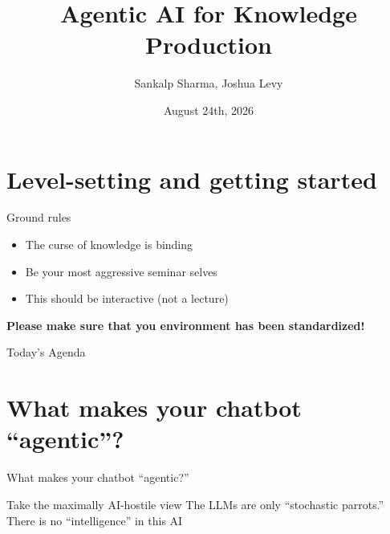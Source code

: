 \documentclass[aspectratio=1610, xcolor={dvipsnames}]{beamer}
\title{Agentic AI for Knowledge Production}
\author{Sankalp Sharma, Joshua Levy}
\institute{University of Southern California}
\date{August 24th, 2026}
\begin{document}
\begin{frame}
    \titlepage
\end{frame}
\section{Level-setting and getting started}

\begin{frame}{Ground rules}
    \begin{itemize}
        \item The curse of knowledge is binding
        \item Be your most aggressive seminar selves
        \item This should be interactive (not a lecture)
    \end{itemize}
    \vspace{3em}
    \textbf{Please make sure that you environment has been standardized!}
\end{frame}

\begin{frame}{Today's Agenda}
    \tableofcontents
\end{frame}


\section{What makes your chatbot ``agentic''?}

\begin{frame}{What makes your chatbot ``agentic?''}
    \begin{block}{Take the maximally AI-hostile view}
        \vspace{0.8em}
        The LLMs are only ``stochastic parrots.'' There is no ``intelligence'' in this AI

    \end{block}

    \vspace{2em}
\end{frame}
\end{document}
